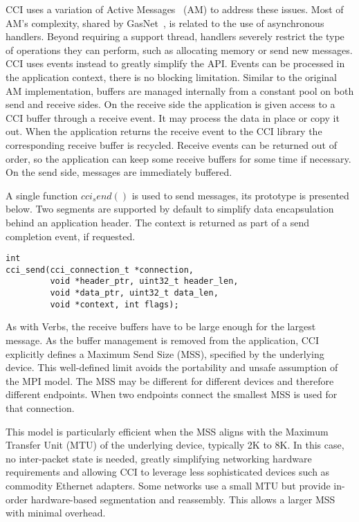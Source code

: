 CCI uses a variation of Active Messages~\cite{voneicken-isca92} (AM) 
to address these issues. 
Most of AM's complexity, shared by GasNet~\cite{gasnet}, is related 
to the use of asynchronous handlers. Beyond requiring a support thread, handlers severely restrict the type of operations they can perform, such as allocating memory or send new messages. CCI uses events instead to greatly simplify the API. Events can be processed in the application context, there is no blocking limitation. Similar to the original AM implementation, buffers are managed 
internally from a constant pool on both send and receive sides. 
On the receive side the application is given access to a CCI buffer through 
a receive event. It may process the data in place or copy it out. When the 
application returns the receive event to the CCI library the corresponding 
receive buffer is recycled. Receive events can be returned out of order, so 
the application can keep some receive buffers for some time if necessary. 
On the send side, messages are immediately buffered.

A single function $cci_send()$ is used to send messages, its prototype is presented below. Two segments are supported by default to simplify data encapsulation behind an application header. The context is returned as part of a send completion event, if requested.

\lstset{language=C, frame=single, basicstyle=\small}
\begin{lstlisting}
int 
cci_send(cci_connection_t *connection, 
         void *header_ptr, uint32_t header_len, 
         void *data_ptr, uint32_t data_len, 
         void *context, int flags);
\end{lstlisting}

As with Verbs, the receive buffers have to be large enough for the largest 
message. As the buffer management is removed from the application, CCI 
explicitly defines a Maximum Send Size (MSS), specified by the underlying  
device. This well-defined limit avoids the portability and unsafe assumption 
of the MPI model. The MSS may be different for 
different devices and therefore different endpoints. When two endpoints 
connect the smallest MSS is used for that connection.

This model is particularly efficient when the MSS aligns with the Maximum 
Transfer Unit (MTU) of the underlying device, typically 2K to 8K. 
In this case, no inter-packet state is needed, greatly simplifying
networking hardware requirements and allowing CCI to leverage less 
sophisticated devices such as commodity Ethernet adapters. 
Some networks use a small MTU but provide in-order hardware-based segmentation and reassembly. This allows a larger MSS with minimal overhead.


